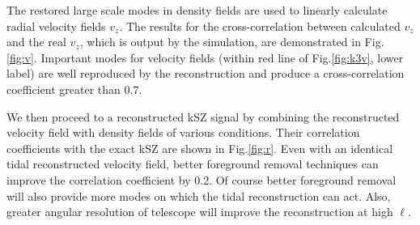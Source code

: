 The restored large scale modes in density fields are used to linearly calculate radial velocity fields $v_z$. 
The results for the cross-correlation between calculated $v_z$ and the real $v_z$, which is output by the simulation, are demonstrated in Fig.\ref{fig:v}. Important modes for velocity fields (within red line of Fig.\ref{fig:k3v}, lower label) are well reproduced by the reconstruction and produce a cross-correlation coefficient greater than $0.7$. 

We then proceed to a reconstructed kSZ signal by combining the reconstructed velocity field with density fields of various conditions. Their correlation coefficients with the exact kSZ are shown in Fig.\ref{fig:r}. Even with an identical tidal reconstructed velocity field, better foreground removal techniques can improve the correlation coefficient by 0.2. Of course better foreground removal will also provide more modes on which the tidal reconstruction can act. Also, greater angular resolution of telescope will improve the reconstruction at high $\ell$. 
